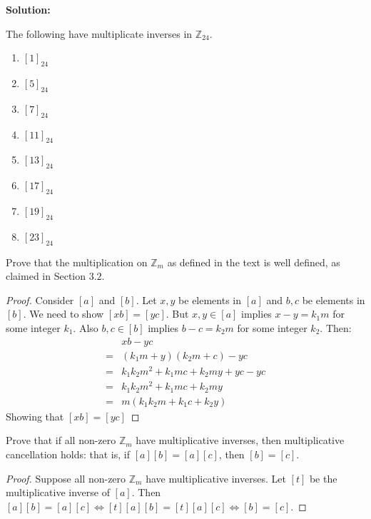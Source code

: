 \textbf{Solution:}

The following have multiplicate inverses in $\mathbb{Z}_{24}$.

\begin{enumerate}
    \item $[1]_{24}$
    \item $[5]_{24}$
    \item $[7]_{24}$
    \item $[11]_{24}$
    \item $[13]_{24}$
    \item $[17]_{24}$
    \item $[19]_{24}$
    \item $[23]_{24}$
\end{enumerate}

\begin{tcolorbox}[title=Problem 9, breakable]
    Prove that the multiplication on $\mathbb{Z}_m$ as defined in the text 
    is well defined, as claimed in Section $3.2$.
\end{tcolorbox}

\begin{proof}
    Consider $[a]$ and $[b]$.
    Let $x, y$ be elements in $[a]$ and $b, c$ be elements in $[b]$.
    We need to show $[xb] = [yc]$.
    But $x,y \in [a]$ implies $x - y = k_1 m$ for some integer $k_1$.
    Also $b, c \in [b]$ implies $b - c = k_2 m$ for some integer $k_2$.
    Then:
    \begin{align*}
        &xb - yc  \\
        =&(k_1 m + y)(k_2 m + c) - yc  \\
        =&k_1 k_2 m^2 + k_1 mc + k_2 my + yc - yc  \\
        =&k_1 k_2 m^2 + k_1 mc + k_2 my  \\
        =&m(k_1 k_2 m + k_1 c + k_2 y)
    \end{align*}
    Showing that $[xb]=[yc]$
\end{proof}

\begin{tcolorbox}[title=Problem 10, breakable]
    Prove that if all non-zero $\mathbb{Z}_m$ have multiplicative inverses,
    then multiplicative cancellation holds: that is, if $[a][b] = [a][c]$, 
    then $[b] = [c]$.
\end{tcolorbox}

\begin{proof}
    Suppose all non-zero $\mathbb{Z}_m$ have multiplicative inverses.
    Let $[t]$ be the multiplicative inverse of $[a]$.
    Then $[a][b] = [a][c] \iff [t][a][b] = [t][a][c] \iff [b] = [c]$.
\end{proof}


